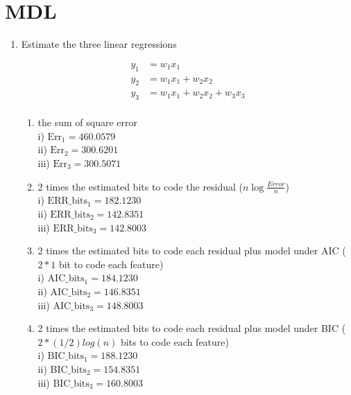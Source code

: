 \documentclass[english]{article}
\begin{document}
\section{MDL}

\begin{enumerate}
\item  Estimate the three linear regressions 

\begin{align*}
  y_1& = w_1 x_1 \\
  y_2& = w_1 x_1 + w_2 x_2 \\
  y_3& = w_1 x_1 + w_2 x_2 + w_3 x_3  \\
\end{align*}

\begin{enumerate}
\item the sum of square error \\
i)   $\text{Err}_1 = 460.0579$ \\
ii)  $\text{Err}_2 = 300.6201$\\
iii) $\text{Err}_3 = 300.5071$\\


\item 2 times the estimated bits to code the residual ($n \log{\frac{Error}{n}} $)  \\
i)    $\text{ERR}\_\text{bits}_1 = 182.1230$ \\
ii)   $\text{ERR}\_\text{bits}_2 = 142.8351$ \\
iii)  $\text{ERR}\_\text{bits}_3 = 142.8003$ \\


\item 2 times the estimated bits to code each residual plus model under AIC ($2*1$ bit to code each feature) \\
i)    $\text{AIC}\_\text{bits}_1 = 184.1230$ \\
ii)   $\text{AIC}\_\text{bits}_2 = 146.8351$ \\
iii)  $\text{AIC}\_\text{bits}_3 = 148.8003$ \\


\item 2 times the estimated bits to code each residual plus model under BIC  ($2*(1/2) log(n)$ bits to code each feature) \\
i)   $\text{BIC}\_\text{bits}_1 = 188.1230$ \\
ii)  $\text{BIC}\_\text{bits}_2 = 154.8351$ \\
iii) $\text{BIC}\_\text{bits}_3 = 160.8003$ \\


\end{enumerate}
\end{enumerate}
\end{document}
